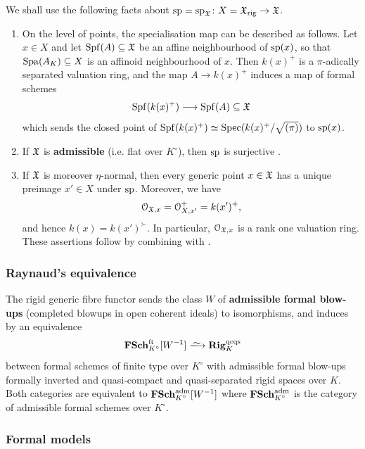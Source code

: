 \begin{rmk} \label{rmk:sp-facts}
We shall use the following facts about ${\rm sp}={\rm sp}_{\mathfrak{X}}\colon X={\mathfrak{X}}_{\rm rig}\to {\mathfrak{X}}$.
\begin{enumerate}
    \item On the level of points, the specialisation map can be described as follows. Let $x\in X$ and let $\operatorname{Spf}(A)\subseteq{\mathfrak{X}}$ be an affine neighbourhood of ${\rm sp}(x)$, so that $\operatorname{Spa}(A_K)\subseteq X$ is an affinoid neighbourhood of $x$. Then $k(x)^+$ is a $\pi$-adically separated valuation ring, and the map $A\to k(x)^+$ induces a map of formal schemes 
    \[
        \operatorname{Spf}(k(x)^+) \longrightarrow \operatorname{Spf}(A) \subseteq {\mathfrak{X}}
    \]
    which sends the closed point of $\operatorname{Spf}(k(x)^+)\simeq \operatorname{Spec}(k(x)^+/\sqrt{(\pi)})$ to ${\rm sp}(x)$.
    \item If ${\mathfrak{X}}$ is {\bf admissible} (i.e. flat over $K^\circ$), then ${\rm sp}$ is surjective \cite[Proposition II 3.1.5]{FujiwaraKato}. 
    \item If ${\mathfrak{X}}$ is moreover $\eta$-normal, then every generic point $x\in {\mathfrak{X}}$ has a unique preimage $x'\in X$ under ${\rm sp}$. Moreover, we have
    \[
        {\mathcal O}_{{\mathfrak{X}}, x} = {\mathcal O}^+_{X, x'} = k(x')^+,
    \]
    and hence $k(x) = k(x')^\succ$. In particular, ${\mathcal O}_{{\mathfrak{X}},x}$ is a rank one valuation ring. These assertions follow by combining \cite[Proposition~2.2]{BhattHansen} with \cite[Lemma~A.12 and Proposition~A.15]{AchingerLaraYoucis2022}. 
\end{enumerate}
\end{rmk}

\subsubsection*{Raynaud's equivalence}

The rigid generic fibre functor sends the class $W$ of {\bf admissible formal blow-ups} (completed blowups in open coherent ideals) to isomorphisms, and induces by \cite[Theorems~II~A.5.1,~A.5.2]{FujiwaraKato} an equivalence
\[ 
    \cat{FSch}^{\rm ft}_{K^\circ}[W^{-1}] \isomto \cat{Rig}_K^{\rm qcqs}
\]
between formal schemes of finite type over $K^\circ$ with admissible formal blow-ups formally inverted and quasi-compact and quasi-separated rigid spaces over $K$. Both categories are equivalent to $\mathbf{FSch}^{\rm adm}_{K^\circ}[W^{-1}]$ where $\mathbf{FSch}^{\rm adm}_{K^\circ}$ is the category of admissible formal schemes over $K^\circ$. 

\subsubsection*{Formal models}

